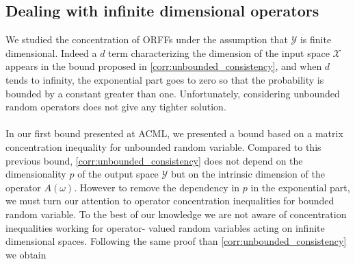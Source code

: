 \subsection{Dealing with infinite dimensional operators}
\label{remark:infinite_dimension}
We studied the concentration of \acsp{ORFF} under the assumption that
$\mathcal{Y}$ is finite dimensional. Indeed a $d$ term characterizing the
dimension of the input space $\mathcal{X}$ appears in the bound proposed in
\cref{corr:unbounded_consistency}, and when $d$ tends to infinity, the
exponential part goes to zero so that the probability is bounded by a
constant greater than one. Unfortunately, considering unbounded random
operators \citep{minsker2011some} does not give any tighter solution.
\paragraph{}
In our first bound presented at \acs{ACML}, we presented a bound based on a
matrix concentration inequality for unbounded random variable. Compared to this
previous bound, \cref{corr:unbounded_consistency} does not depend on the
dimensionality $p$ of the output space $\mathcal{Y}$ but on the intrinsic
dimension of the operator $A(\omega)$. However to remove the dependency in $p$
in the exponential part, we must turn our attention to operator concentration
inequalities for bounded random variable. To the best of our knowledge we are
not aware of concentration inequalities working for  operator-
valued random variables acting on infinite dimensional spaces. Following the
same proof than \cref{corr:unbounded_consistency} we obtain
